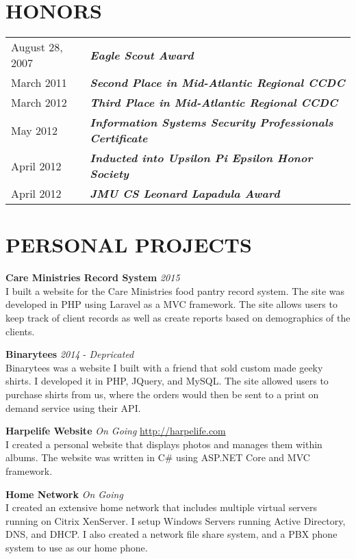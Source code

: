 \documentclass[line, margin]{res}
\begin{document}
\begin{resume}
\section{HONORS}
\begin{tabular}{@{}l l}
August 28, 2007 & \textbf{\textit{Eagle Scout Award}} \\ [5pt]
March 2011 & \textbf{\textit{Second Place in Mid-Atlantic Regional CCDC}} \\ [5pt]
March 2012 & \textbf{\textit{Third Place in Mid-Atlantic Regional CCDC}} \\ [5pt]
May 2012 & \textbf{\textit{Information Systems Security Professionals Certificate}} \\ [5pt]
April 2012 & \textbf{\textit{Inducted into Upsilon Pi Epsilon Honor Society}} \\ [5pt]
April 2012 & \textbf{\textit{JMU CS Leonard Lapadula Award}} \\
\end{tabular}

\section{PERSONAL PROJECTS}
\textbf{Care Ministries Record System} \textit{2015} \\
I built a website for the Care Ministries food pantry record system. The site was developed in PHP using Laravel as a MVC framework. The site allows users to keep track of client records as well as create reports based on demographics of the clients.

\textbf{Binarytees} \textit{2014} - \textit{Depricated} \\
Binarytees was a website I built with a friend that sold custom made geeky shirts. I developed it in PHP, JQuery, and MySQL. The site allowed users to purchase shirts from us, where the orders would then be sent to a print on demand service using their API. 

\textbf{Harpelife Website} \textit{On Going} \hfill \url{http://harpelife.com} \\
I created a personal website that displays photos and manages them within albums. The website was written in C# using ASP.NET Core and MVC framework.

\textbf{Home Network} \textit{On Going} \\
I created an extensive home network that includes multiple virtual servers running on Citrix XenServer. I setup Windows Servers running Active Directory, DNS, and DHCP. I also created a network file share system, and a PBX phone system to use as our home phone.

\end{resume}
\end{document}
